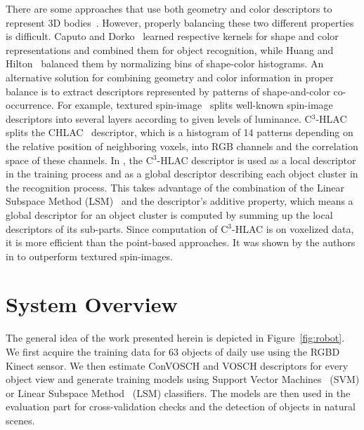\documentclass[letterpaper, 10 pt, conference]{sty/ieeeconf}
\begin{document}
There are some approaches that use both geometry and color descriptors to
represent 3D bodies~\cite{park2006}. However, properly balancing these two
different properties is difficult.  Caputo and Dorko~\cite{caputo2002} learned
respective kernels for shape and color representations and combined them for
object recognition, while Huang and Hilton~\cite{huang2009} balanced them by
normalizing bins of shape-color histograms.  An alternative solution for combining
geometry and color information in proper balance is to extract descriptors
represented by patterns of shape-and-color co-occurrence.  For example, textured
spin-image~\cite{cortelazzo2006} splits well-known
spin-image~\cite{Johnson_spin_images} descriptors into several layers
according to given levels of luminance. C$^3$-HLAC~\cite{kanezaki2011icra} 
splits the CHLAC~\cite{kobayashi2004} descriptor, which is a histogram of 14 patterns 
depending on the relative position of neighboring voxels, into RGB channels and the correlation 
space of these channels.  In \cite{kanezaki2011icra}, the C$^3$-HLAC descriptor is used as a local
descriptor in the training process and as a global descriptor describing each
object cluster in the recognition process. This takes advantage of the combination
of the Linear Subspace Method (LSM)~\cite{watanabe1973} and the descriptor's additive property, 
which means a global descriptor for an object cluster is computed by summing up the local descriptors of its sub-parts.
Since computation of C$^3$-HLAC is on voxelized data, it is more efficient
than the point-based approaches. It was shown by the authors in \cite{kanezaki2011icra} to outperform textured spin-images.

\section{System Overview}
\label{sec:overview}
The general idea of the work presented herein is depicted in 
Figure~\ref{fig:robot}. We first acquire the training data for 63 objects
of daily use using the RGBD Kinect sensor. We then estimate ConVOSCH and VOSCH descriptors 
for every object view and generate training models using Support Vector
Machines~\cite{svm99} (SVM) or Linear Subspace Method~\cite{watanabe1973} (LSM) classifiers. The models are then used
in the evaluation part for cross-validation checks and the detection of 
objects in natural scenes.
\end{document}
